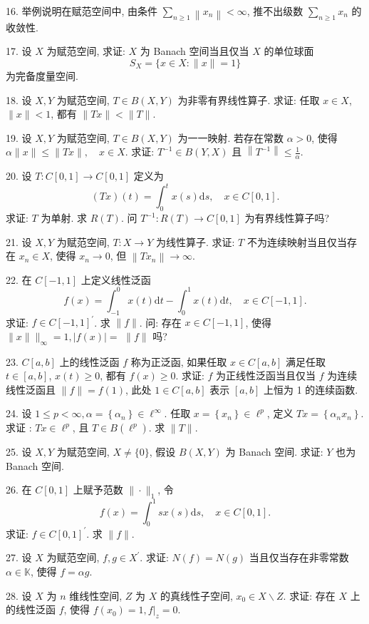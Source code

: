 \documentclass[openany]{ctexbook}
\theoremstyle{kaiti}
\theoremstyle{normal}
\begin{document}
16. 举例说明在赋范空间中, 由条件 $\sum_{n \geqslant 1}\left\|x_n\right\|<\infty$, 推不出级数 $\sum_{n \geqslant 1} x_n$ 的收敛性.

17. 设 $X$ 为赋范空间, 求证: $X$ 为 Banach 空间当且仅当 $X$ 的单位球面
$$
S_{X}=\{x \in X:\|x\|=1\}
$$
为完备度量空间.

18. 设 $X, Y$ 为赋范空间, $T \in B(X, Y)$ 为非零有界线性算子. 求证: 任取 $x \in X$, $\|x\|<1$, 都有 $\|T x\|<\|T\|$.

19. 设 $X, Y$ 为赋范空间, $T \in B(X, Y)$ 为一一映射. 若存在常数 $\alpha>0$, 使得 $\alpha\|x\| \leqslant\|T x\|, \quad x \in X.$
求证: $T^{-1} \in B(Y, X)$ 且 $\left\|T^{-1}\right\| \leqslant \frac{1}{\alpha}$.

20. 设 $T: C[0,1] \rightarrow C[0,1]$ 定义为
$$
(T x)(t)=\int_0^{t} x(s) \mathrm{d} s, \quad x \in C[0,1].
$$
求证: $T$ 为单射. 求 $R(T)$. 问 $T^{-1}: R(T) \rightarrow C[0,1]$ 为有界线性算子吗?

21. 设 $X, Y$ 为赋范空间, $T: X \rightarrow Y$ 为线性算子. 求证: $T$ 不为连续映射当且仅当存在 $x_n \in X$, 使得 $x_n \rightarrow 0$, 但 $\left\|T x_n\right\| \rightarrow \infty$.

22. 在 $C[-1,1]$ 上定义线性泛函
$$
f(x)=\int_{-1}^0 x(t) \mathrm{d} t-\int_0^1 x(t) \mathrm{d} t, \quad x \in C[-1,1].
$$
求证: $f \in C[-1,1]^{\prime}$. 求 $\|f\|$. 问: 存在 $x \in C[-1,1]$, 使得 $\|x\| \|_{\infty}=1,|f(x)|=$ $\|f\|$ 吗?

23. $C[a, b]$ 上的线性泛函 $f$ 称为正泛函, 如果任取 $x \in C[a, b]$ 满足任取 $t \in[a, b]$, $x(t) \geqslant 0$, 都有 $f(x) \geqslant 0$. 求证: $f$ 为正线性泛函当且仅当 $f$ 为连续线性泛函且 $\|f\|=f(1)$, 此处 $1 \in C[a, b]$ 表示 $[a, b]$ 上恒为 1 的连续函数.

24. 设 $1 \leqslant p<\infty, \alpha=\left\{\alpha_n\right\} \in \ell^{\infty}$. 任取 $x=\left\{x_n\right\} \in \ell^{p}$, 定义 $T x=\left\{\alpha_n x_n\right\}$. 求证 : $T x \in \ell^{p}$, 且 $T \in B\left(\ell^{p}\right)$. 求 $\|T\|$.

25. 设 $X, Y$ 为赋范空间, $X \neq\{0\}$, 假设 $B(X, Y)$ 为 Banach 空间. 求证: $Y$ 也为 Banach 空间.

26. 在 $C[0,1]$ 上赋予范数 $\|\cdot\|_1$, 令
$$
f(x)=\int_0^1 s x(s) \mathrm{d} s, \quad x \in C[0,1].
$$
求证: $f \in C[0,1]^{\prime}$. 求 $\|f\|$.

27. 设 $X$ 为赋范空间, $f, g \in X^{\prime}$. 求证: $N(f)=N(g)$ 当且仅当存在非零常数 $\alpha \in \mathbb{K}$, 使得 $f=\alpha g$.

28. 设 $X$ 为 $n$ 维线性空间, $Z$ 为 $X$ 的真线性子空间, $x_0 \in X \backslash Z$. 求证: 存在 $X$ 上的线性泛函 $f$, 使得 $f\left(x_0\right)=1,\left.f\right|_{z}=0$.
\end{document}
